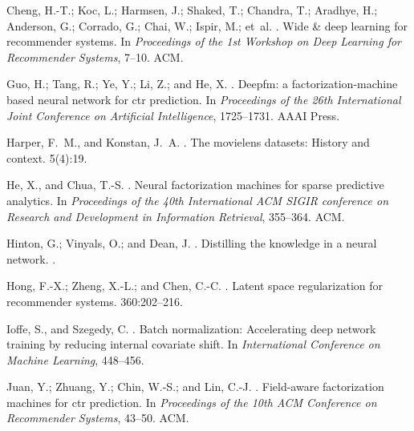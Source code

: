 \documentclass[letterpaper]{article} \usepackage{aaai19}  \usepackage{times}  \usepackage{helvet}  \usepackage{courier}  \usepackage{url}  \usepackage{graphicx}  \frenchspacing  \setlength{\pdfpagewidth}{8.5in}  \setlength{\pdfpageheight}{11in}  \usepackage{mathtools}
\begin{document}
\begin{thebibliography}{}
Cheng, H.-T.; Koc, L.; Harmsen, J.; Shaked, T.; Chandra, T.; Aradhye, H.;
  Anderson, G.; Corrado, G.; Chai, W.; Ispir, M.; et~al.
.
\newblock Wide \& deep learning for recommender systems.
\newblock In {\em Proceedings of the 1st Workshop on Deep Learning for
  Recommender Systems},  7--10.
\newblock ACM.

Guo, H.; Tang, R.; Ye, Y.; Li, Z.; and He, X.
.
\newblock Deepfm: a factorization-machine based neural network for ctr
  prediction.
\newblock In {\em Proceedings of the 26th International Joint Conference on
  Artificial Intelligence},  1725--1731.
\newblock AAAI Press.

Harper, F.~M., and Konstan, J.~A.
.
\newblock The movielens datasets: History and context.
  5(4):19.

He, X., and Chua, T.-S.
.
\newblock Neural factorization machines for sparse predictive analytics.
\newblock In {\em Proceedings of the 40th International ACM SIGIR conference on
  Research and Development in Information Retrieval},  355--364.
\newblock ACM.

Hinton, G.; Vinyals, O.; and Dean, J.
.
\newblock Distilling the knowledge in a neural network.
.

Hong, F.-X.; Zheng, X.-L.; and Chen, C.-C.
.
\newblock Latent space regularization for recommender systems.
 360:202--216.

Ioffe, S., and Szegedy, C.
.
\newblock Batch normalization: Accelerating deep network training by reducing
  internal covariate shift.
\newblock In {\em International Conference on Machine Learning},  448--456.

Juan, Y.; Zhuang, Y.; Chin, W.-S.; and Lin, C.-J.
.
\newblock Field-aware factorization machines for ctr prediction.
\newblock In {\em Proceedings of the 10th ACM Conference on Recommender
  Systems},  43--50.
\newblock ACM.


\end{thebibliography}
\end{document}
